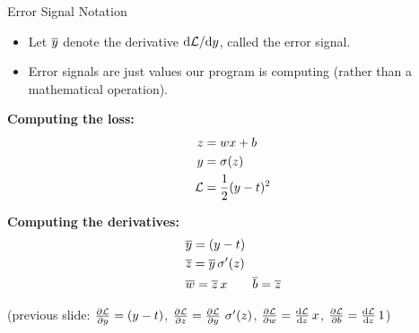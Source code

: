 \documentclass[handout,aspectratio=169]{beamer}
\begin{document}
\begin{frame}{Error Signal Notation}
  \begin{itemize}
  \item Let $\overline{y}$ denote the derivative $\mathrm{d} {\cal L} / \mathrm{d} y$, called the \alert{error signal}.
  \item Error signals are just values our program is computing (rather than a mathematical operation).
  \end{itemize}

  \vspace{.1em}

\begin{minipage}{0.49\textwidth}

\vspace{1em}

{\bf Computing the loss:}
\begin{align*}
      z &= w x + b \\
      y &= \sigma(z) \\
      {\cal L} &= \frac{1}{2} (y - t)^2 
\end{align*}
    
\end{minipage}\begin{minipage}{0.49 \textwidth}

{\bf Computing the derivatives:}
\begin{align*}
& \overline{y} = (y - t) \\
& \overline{z} = \overline{y} \, \sigma^\prime(z) \\
& \overline{w} = \overline{z} \, x \qquad \overline{b} = \overline{z}
    \end{align*}
\end{minipage}
\bigskip 

(previous slide: ${\frac{\partial {\cal L}}{\partial y}} = (y - t)$,\;\;
 ${\frac{\partial {\cal L}}{\partial z}} = \frac{\partial {\cal L}}{\partial y} \,\,  \sigma^\prime (z)$,\;\; $\frac{\partial {\cal L}}{\partial w} 
= {\frac{\mathrm{d} {\cal L}}{\mathrm{d} z}}\, x $,\;\; $\frac{\partial {\cal L}}{\partial b} 
= {\frac{\mathrm{d} {\cal L}}{\mathrm{d} z}} \, 1$)
\end{frame}
\end{document}
